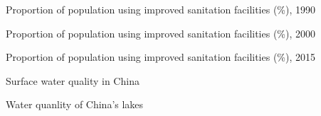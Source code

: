\begin{frame}{Proportion of population using improved sanitation facilities (\%), 1990}
\end{frame}

\begin{frame}{Proportion of population using improved sanitation facilities (\%), 2000}
\end{frame}

\begin{frame}{Proportion of population using improved sanitation facilities (\%), 2015}
\end{frame}

\begin{frame}{Surface water quality in China}
\end{frame}

\begin{frame}{Water quanlity of China's lakes}
\end{frame}
